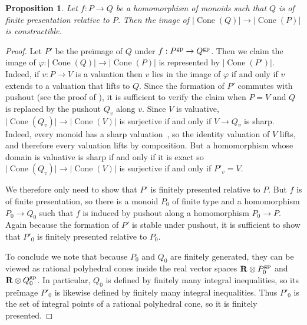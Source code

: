 \documentclass[10pt]{article}
\numberwithin{equation}{section}
\newtheorem{proposition}[paragraph]{Proposition}
\theoremstyle{definition}
\theoremstyle{remark}
\def\Cone{\operatorname{Cone}}
\newcommand{\gp}[1]{#1^{\rm gp}}
\begin{document}
\begin{proposition} \label{prop:1}
	Let $f : P \to Q$ be a homomorphism of monoids such that $Q$ is of finite presentation relative to $P$.  Then the image of $\lvert\Cone(Q)\rvert \to \lvert\Cone(P)\rvert$ is 
	constructible.
\end{proposition}
\begin{proof}
	Let $P'$ be the pre\"image of $Q$ under $f : \gp P \to \gp Q$.  Then we claim the image of $\varphi : \lvert\Cone(Q)\rvert \to \lvert\Cone(P)\rvert$ is represented by $\lvert\Cone(P')\rvert$.  Indeed, if $v : P \to V$ is a valuation then $v$ lies in the image of $\varphi$ if and only if $v$ extends to a valuation that lifts to $Q$.  Since the formation of $P'$ commutes with pushout (see the proof of \cite[Proposition~I.3.2~(2)]{Tsuji}), it is sufficient to verify the claim when $P = V$ and $Q$ is replaced by the pushout $Q_v$ along $v$.  Since $V$ is valuative, $\lvert\Cone(Q_v)\rvert \to \lvert\Cone(V)\rvert$ is surjective if and only if $V \to Q_v$ is sharp.  Indeed, every monoid has a sharp valuation~\cite[Proposition~I.2.4.1]{ogusloggeom}, so the identity valuation of $V$ lifts, and therefore every valuation lifts by composition.  But a homomorphism whose domain is valuative is sharp if and only if it is exact so $\lvert\Cone(Q_v)\rvert \to \lvert\Cone(V)\rvert$ is surjective if and only if $P'_v = V$.



	We therefore only need to show that $P'$ is finitely presented relative to $P$.  But $f$ is of finite presentation, so there is a monoid $P_0$ of finite type and a homomorphism $P_0 \to Q_0$ such that $f$ is induced by pushout along a homomorphism $P_0 \to P$.  Again because the formation of $P'$ is stable under pushout, it is sufficient to show that $P'_0$ is finitely presented relative to $P_0$.

	To conclude we note that because $P_0$ and $Q_0$ are finitely generated, they can be viewed as rational polyhedral cones inside the real vector spaces $\mathbf R \otimes \gp P_0$ and $\mathbf R \otimes \gp Q_0$.  In particular, $Q_0$ is defined by finitely many integral inequalities, so its pre\"image $P'_0$ is likewise defined by finitely many integral inequalities.  Thus $P'_0$ is the set of integral points of a rational polyhedral cone, so it is finitely presented.
\end{proof}
\end{document}
